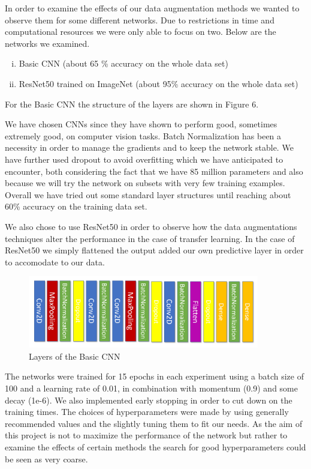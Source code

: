 \documentclass{article}
\begin{document}
In order to examine the effects of our data augmentation methods we wanted to observe them for some different networks. Due to restrictions in time and computational resources we were only able to focus on two. Below are the networks we examined.

\begin{enumerate}[(i)]
 \item Basic CNN (about 65 \% accuracy on the whole data set)
 \item ResNet50 trained on ImageNet (about 95\% accuracy on the whole data set)
\end{enumerate}

For the Basic CNN the structure of the layers are shown in Figure 6.

We have chosen CNNs since they have shown to perform good, sometimes extremely good, on computer vision tasks. Batch Normalization has been a necessity in order to manage the gradients and to keep the network stable. We have further used dropout to avoid overfitting which we have anticipated to encounter, both considering the fact that we have 85 million parameters and also because we will try the network on subsets with very few training examples. Overall we have tried out some standard layer structures until reaching about 60\% accuracy on the training data set.

We also chose to use ResNet50 in order to observe how the data augmentations techniques alter the performance in the case of transfer learning. In the case of ResNet50 we simply flattened the output added our own predictive layer in order to accomodate to our data.

\begin{figure}[H]
	\centering
	\includegraphics[width=0.9\textwidth]{conv.PNG}
	\caption{Layers of the Basic CNN}
\end{figure}

The networks were trained for 15 epochs in each experiment using a batch size of 100 and a learning rate of 0.01, in combination with momentum (0.9) and some decay (1e-6). We also implemented early stopping in order to cut down on the training times. The choices of hyperparameters were made by using generally recommended values and the slightly tuning them to fit our needs. As the aim of this project is not to maximize the performance of the network but rather to examine the effects of certain methods the search for good hyperparameters could be seen as very coarse.
\end{document}
